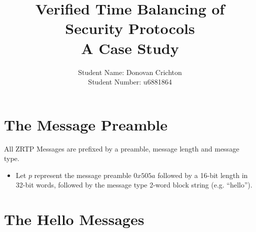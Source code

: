 \documentclass[11pt]{article}
\title{Verified Time Balancing of Security Protocols 
  \\ \large A Case Study}
\author{Student Name: Donovan Crichton\\
Student Number: u6881864}
\date{}
\begin{document}
\maketitle
  \section*{The Message Preamble}
  All ZRTP Messages are prefixed by a preamble, message length
  and message type. 
  \begin{itemize}
  \item Let $p$ represent the message preamble $0x505a$ followed
        by a 16-bit length in 32-bit words, followed by the 
        message type 2-word block string (e.g. ``hello'').
  \end{itemize}
  \section*{The Hello Messages}
\end{document}
